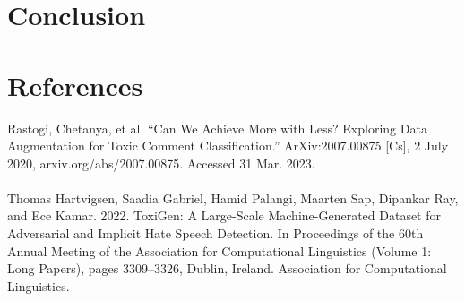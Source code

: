 \documentclass[11pt,a4paper]{article}
\begin{document}
\section{Conclusion}

\section*{References}
Rastogi, Chetanya, et al. “Can We Achieve More with Less? Exploring Data Augmentation for Toxic Comment Classification.” ArXiv:2007.00875 [Cs], 2 July 2020, arxiv.org/abs/2007.00875. Accessed 31 Mar. 2023.\\\\
Thomas Hartvigsen, Saadia Gabriel, Hamid Palangi, Maarten Sap, Dipankar Ray, and Ece Kamar. 2022. ToxiGen: A Large-Scale Machine-Generated Dataset for Adversarial and Implicit Hate Speech Detection. In Proceedings of the 60th Annual Meeting of the Association for Computational Linguistics (Volume 1: Long Papers), pages 3309–3326, Dublin, Ireland. Association for Computational Linguistics.
\end{document}
